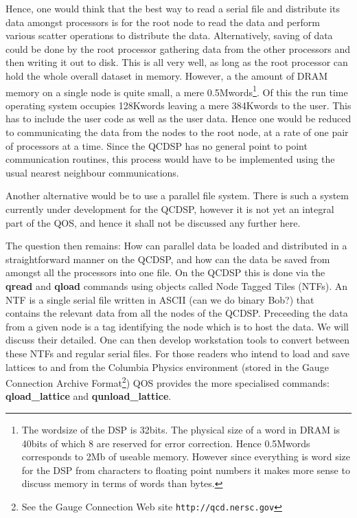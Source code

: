 Hence, one would think that the best way to read a serial file and
distribute its data amongst processors is for the root node to read
the data and perform various scatter operations to distribute the
data.  Alternatively, saving of data could be done by the root
processor gathering data from the other processors and then writing it
out to disk. This is all very well, as long as the root processor can
hold the whole overall dataset in memory. However, a the amount of
DRAM memory on a single node is quite small, a mere
0.5Mwords\footnote{The wordsize of the DSP is 32bits. The physical
size of a word in DRAM is 40bits of which 8 are reserved for error
correction. Hence 0.5Mwords corresponds to 2Mb of useable
memory. However since everything is word size for the DSP from
characters to floating point numbers it makes more sense to discuss
memory in terms of words than bytes.}. Of this the run time operating
system occupies 128Kwords leaving a mere 384Kwords to the user. This
has to include the user code as well as the user data. Hence one
would be reduced to communicating the data from the nodes to the root node, at 
a rate of one pair of processors at a time. Since the QCDSP has no general
point to point communication routines, this process would have to be implemented
using the usual nearest neighbour communications.

Another alternative would be to use a parallel file system. There is 
such a system currently under development for the QCDSP, however it
is not yet an integral part of the QOS, and hence it shall not be 
discussed any further here. 

The question then remains: How can parallel data be loaded and
distributed in a straightforward manner on the QCDSP, and how can the
data be saved from amongst all the processors into one file. On the
QCDSP this is done via the {\bf qread} and {\bf qload} commands using
objects called Node Tagged Tiles (NTFs). An NTF is a single serial
file written in ASCII (can we do binary Bob?) that contains the
relevant data from all the nodes of the QCDSP. Preceeding the data
from a given node is a tag identifying the node which is to host the
data. We will discuss their detailed. One can then develop
workstation tools to convert between these NTFs and regular serial
files. For those readers who intend to load and save lattices to and
from the Columbia Physics environment (stored in the Gauge Connection
Archive Format\footnote{See the Gauge Connection Web site {\tt http://qcd.nersc.gov}}) QOS provides the more specialised commands: {\bf
qload\_lattice} and {\bf qunload\_lattice}. 

